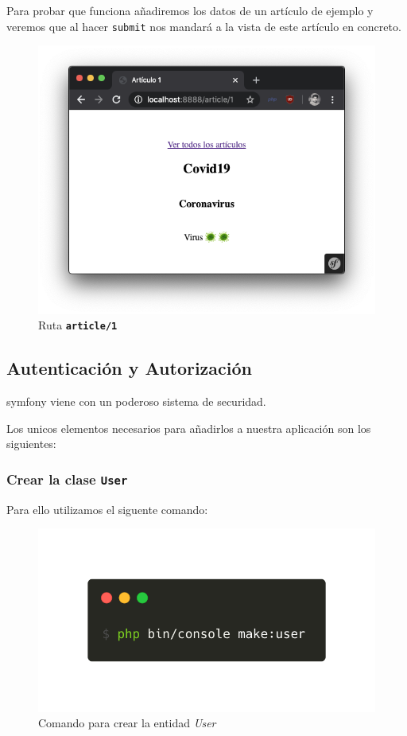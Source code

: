 \clearpage
Para probar que funciona añadiremos los datos de un artículo de ejemplo y veremos que al hacer \texttt{submit} nos mandará a la vista de este artículo en concreto.

\begin{figure}[ht]
  \centering
  \includegraphics[width=\textwidth]{../assets/article_render.png}
  \caption{Ruta \texttt{\textbf{article/1}}}
  \label{fig:article_render}
\end{figure}

\clearpage
\subsection{Autenticación y Autorización}

symfony viene con un poderoso sistema de securidad.

Los unicos elementos necesarios para añadirlos a nuestra aplicación son los siguientes:

\subsubsection{Crear la clase \texttt{User}}
Para ello utilizamos el siguente comando:

\begin{figure}[ht]
  \centering
  \includegraphics[width=\textwidth]{../assets/make_user.png}
  \caption{Comando para crear la entidad \textit{User}}
  \label{fig:make_user}
\end{figure}


